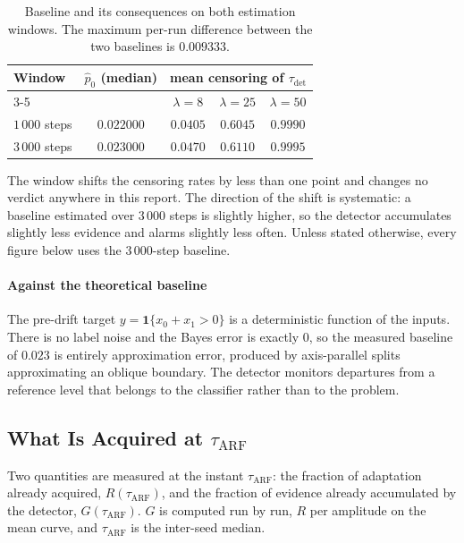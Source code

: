 \documentclass[10pt,conference]{IEEEtran}
\theoremstyle{definition}
\begin{document}
\begin{table}[t]
  \centering
\caption{Baseline and its consequences on both estimation windows. The maximum per-run
  difference between the two baselines is $0.009333$.}
\label{tab:socle}
  \small
  \begin{tabular}{lcccc}
    \toprule
    Window & $\hat p_0$ (median) & \multicolumn{3}{c}{mean censoring of $\tau_{\mathrm{det}}$} \\
    \cmidrule(lr){3-5}
     & & $\lambda = 8$ & $\lambda = 25$ & $\lambda = 50$ \\
    \midrule
    $1\,000$ steps & $0.022000$ & $0.0405$ & $0.6045$ & $0.9990$ \\
    $3\,000$ steps & $0.023000$ & $0.0470$ & $0.6110$ & $0.9995$ \\
    \bottomrule
  \end{tabular}

\end{table}

The window shifts the censoring rates by less than one point and changes no verdict
anywhere in this report. The direction of the shift is systematic: a baseline estimated
over $3\,000$ steps is slightly higher, so the detector accumulates slightly less evidence
and alarms slightly less often. Unless stated otherwise, every figure below uses the
$3\,000$-step baseline.

\paragraph{Against the theoretical baseline} The pre-drift target
$y = \mathbf{1}\{x_0 + x_1 > 0\}$ is a deterministic function of the inputs. There is no
label noise and the Bayes error is exactly $0$, so the measured baseline of $0.023$ is
entirely approximation error, produced by axis-parallel splits approximating an oblique
boundary. The detector monitors departures from a reference level that belongs to the
classifier rather than to the problem.

\subsection{What Is Acquired at $\tau_{\mathrm{ARF}}$}

Two quantities are measured at the instant $\tau_{\mathrm{ARF}}$: the fraction of
adaptation already acquired, $R(\tau_{\mathrm{ARF}})$, and the fraction of evidence
already accumulated by the detector, $G(\tau_{\mathrm{ARF}})$. $G$ is computed run by run,
$R$ per amplitude on the mean curve, and $\tau_{\mathrm{ARF}}$ is the inter-seed median.
\end{document}
